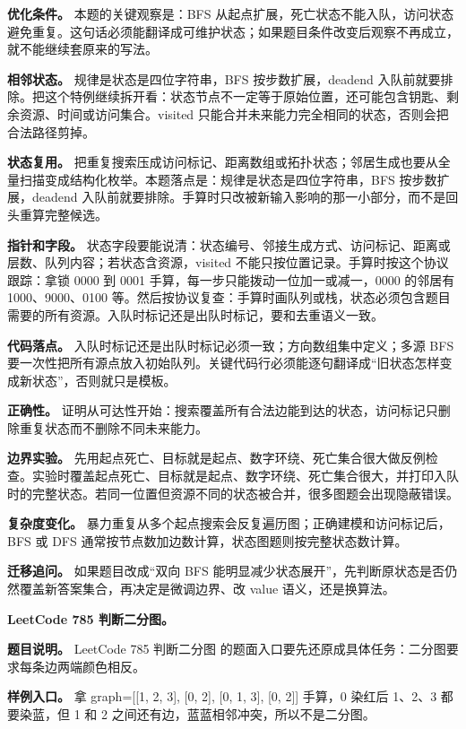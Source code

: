 \textbf{优化条件。} 本题的关键观察是：BFS 从起点扩展，死亡状态不能入队，访问状态避免重复。这句话必须能翻译成可维护状态；如果题目条件改变后观察不再成立，就不能继续套原来的写法。

\textbf{相邻状态。} 规律是状态是四位字符串，BFS 按步数扩展，deadend 入队前就要排除。把这个特例继续拆开看：状态节点不一定等于原始位置，还可能包含钥匙、剩余资源、时间或访问集合。visited 只能合并未来能力完全相同的状态，否则会把合法路径剪掉。

\textbf{状态复用。} 把重复搜索压成访问标记、距离数组或拓扑状态；邻居生成也要从全量扫描变成结构化枚举。本题落点是：规律是状态是四位字符串，BFS 按步数扩展，deadend 入队前就要排除。手算时只改被新输入影响的那一小部分，而不是回头重算完整候选。

\textbf{指针和字段。} 状态字段要能说清：状态编号、邻接生成方式、访问标记、距离或层数、队列内容；若状态含资源，visited 不能只按位置记录。手算时按这个协议跟踪：拿锁 0000 到 0001 手算，每一步只能拨动一位加一或减一，0000 的邻居有 1000、9000、0100 等。然后按协议复查：手算时画队列或栈，状态必须包含题目需要的所有资源。入队时标记还是出队时标记，要和去重语义一致。

\textbf{代码落点。} 入队时标记还是出队时标记必须一致；方向数组集中定义；多源 BFS 要一次性把所有源点放入初始队列。关键代码行必须能逐句翻译成“旧状态怎样变成新状态”，否则就只是模板。

\textbf{正确性。} 证明从可达性开始：搜索覆盖所有合法边能到达的状态，访问标记只删除重复状态而不删除不同未来能力。

\textbf{边界实验。} 先用起点死亡、目标就是起点、数字环绕、死亡集合很大做反例检查。实验时覆盖起点死亡、目标就是起点、数字环绕、死亡集合很大，并打印入队时的完整状态。若同一位置但资源不同的状态被合并，很多图题会出现隐蔽错误。

\textbf{复杂度变化。} 暴力重复从多个起点搜索会反复遍历图；正确建模和访问标记后，BFS 或 DFS 通常按节点数加边数计算，状态图题则按完整状态数计算。

\textbf{迁移追问。} 如果题目改成“双向 BFS 能明显减少状态展开”，先判断原状态是否仍然覆盖新答案集合，再决定是微调边界、改 value 语义，还是换算法。

\noindent\textbf{LeetCode 785 判断二分图。}

\textbf{题目说明。} LeetCode 785 判断二分图 的题面入口要先还原成具体任务：二分图要求每条边两端颜色相反。

\textbf{样例入口。} 拿 graph=[[1, 2, 3], [0, 2], [0, 1, 3], [0, 2]] 手算，0 染红后 1、2、3 都要染蓝，但 1 和 2 之间还有边，蓝蓝相邻冲突，所以不是二分图。

